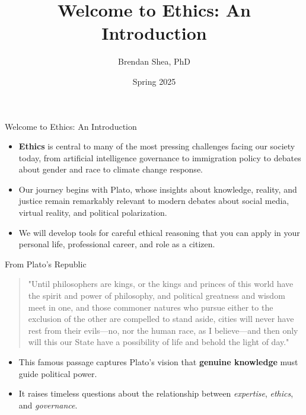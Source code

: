 \documentclass[aspectratio=169]{beamer}
\title{Welcome to Ethics: An Introduction}
\author{Brendan Shea, PhD}
\institute{Rochester Community and Technical College}
\date{Spring 2025}
\begin{document}
\begin{frame}
\titlepage
\end{frame}

\begin{frame}{Welcome to Ethics: An Introduction}
\begin{itemize}
\item \textbf{Ethics} is central to many of the most pressing challenges facing our society today, from artificial intelligence governance to immigration policy to debates about gender and race to climate change response.
\item Our journey begins with Plato, whose insights about knowledge, reality, and justice remain remarkably relevant to modern debates about social media, virtual reality, and political polarization.
\item We will develop tools for careful ethical reasoning that you can apply in your personal life, professional career, and role as a citizen.
\end{itemize}
\end{frame}

\begin{frame}{From Plato's Republic}
\begin{quote}
\small
"Until philosophers are kings, or the kings and princes of this world have the spirit and power of philosophy, and political greatness and wisdom meet in one, and those commoner natures who pursue either to the exclusion of the other are compelled to stand aside, cities will never have rest from their evils—no, nor the human race, as I believe—and then only will this our State have a possibility of life and behold the light of day."
\end{quote}
\vspace{0.5cm}
\begin{itemize}
\item This famous passage captures Plato's vision that \textbf{genuine knowledge} must guide political power.
\item It raises timeless questions about the relationship between \emph{expertise}, \emph{ethics}, and \emph{governance}.
\end{itemize}
\end{frame}
\end{document}
